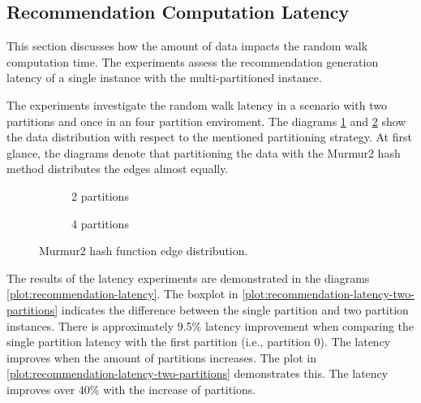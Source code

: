 \subsection{Recommendation Computation Latency}
\label{subsec:recommendation-computation-latency}
This section discusses how the amount of data impacts the random walk computation time. The experiments assess the recommendation generation latency of a single instance with the multi-partitioned instance.


The experiments investigate the random walk latency in a scenario with two partitions and once in an four partition enviroment. The diagrams \ref{plot:edge-distribution-2-partitions-murmur2} and \ref{plot:edge-distribution-4-partitions-murmur2} show the data distribution with respect to the mentioned partitioning strategy. At first glance, the diagrams denote that partitioning the data with the Murmur2 hash method distributes the edges almost equally. 

\begin{figure}[ht!]
    \centering
    \begin{subfigure}{\textwidth}
        \centering
        
        \caption{2 partitions}
        \label{plot:edge-distribution-2-partitions-murmur2}
    \end{subfigure}\qquad

    \begin{subfigure}{\textwidth}
        \centering
        
        \caption{4 partitions}
        \label{plot:edge-distribution-4-partitions-murmur2}
    \end{subfigure}\qquad
    \caption{Murmur2 hash function edge distribution.}
    \label{plot:edge-distirbution-murmur2}
\end{figure}


The results of the latency experiments are demonstrated in the diagrams \ref{plot:recommendation-latency}. The boxplot in \ref{plot:recommendation-latency-two-partitions} indicates the difference between the single partition and two partition instances. There is approximately 9.5\% latency improvement when comparing the single partition latency with the first partition (i.e., partition 0). The latency improves when the amount of partitions increases. The plot in \ref{plot:recommendation-latency-two-partitions} demonstrates this. The latency improves over 40\% with the increase of partitions. 

